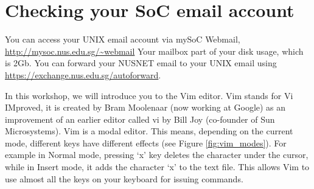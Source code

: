 \section{Checking your SoC email account}
\begin{frame}
You can access your UNIX email account via mySoC Webmail, \url{http://mysoc.nus.edu.sg/~webmail}
Your mailbox part of your disk usage, which is 2Gb. You can forward your NUSNET
email to your UNIX email using \url{https://exchange.nus.edu.sg/autoforward}.
\end{frame}

In this workshop, we will introduce you to the Vim editor.  Vim stands for Vi
IMproved, it is created by Bram Moolenaar (now working at Google) as an
improvement of an earlier editor called vi by Bill Joy (co-founder of Sun
Microsystems).  Vim is a modal editor. This means, depending on the current
mode, different keys have different effects (see Figure \ref{fig:vim_modes}).  
For example in Normal mode, pressing `x' key deletes the character under the
cursor, while in Insert mode, it adds the character `x' to the text file. This
allows Vim to use almost all the keys on your keyboard for issuing commands.  


